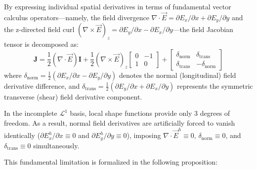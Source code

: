 \documentclass[preprint,12pt]{elsarticle}
\begin{document}
By expressing individual spatial derivatives in terms of fundamental vector calculus operators---namely, the field divergence $\nabla \cdot \vec{E} = \partial E_x/\partial x + \partial E_y/\partial y$ and the z-directed field curl $(\nabla \times \vec{E})_z = \partial E_y/\partial x - \partial E_x/\partial y$---the field Jacobian tensor is decomposed as:
\begin{equation}
    \mathbf{J} = \frac{1}{2}(\nabla \cdot \vec{E}) \mathbf{I} + \frac{1}{2}(\nabla \times \vec{E})_z \begin{bmatrix} 0 & -1 \\ 1 & 0 \end{bmatrix} + \begin{bmatrix} \delta_{\mathrm{norm}} & \delta_{\mathrm{trans}} \\ \delta_{\mathrm{trans}} & -\delta_{\mathrm{norm}} \end{bmatrix}
    \label{eq:jacobian_tensor_EM_decomposition}
\end{equation}
where $\delta_{\mathrm{norm}} = \frac{1}{2}(\partial E_x/\partial x - \partial E_y/\partial y)$ denotes the normal (longitudinal) field derivative difference, and $\delta_{\mathrm{trans}} = \frac{1}{2}(\partial E_y/\partial x + \partial E_x/\partial y)$ represents the symmetric transverse (shear) field derivative component.

In the incomplete $\mathcal{L}^1$ basis, local shape functions provide only 3 degrees of freedom. As a result, normal field derivatives are artificially forced to vanish identically ($\partial E_x^h/\partial x \equiv 0$ and $\partial E_y^h/\partial y \equiv 0$), imposing $\nabla \cdot \vec{E}^h \equiv 0$, $\delta_{\mathrm{norm}} \equiv 0$, and $\delta_{\mathrm{trans}} \equiv 0$ simultaneously.

This fundamental limitation is formalized in the following proposition:
\end{document}
